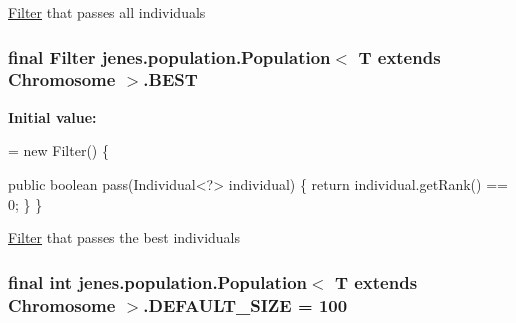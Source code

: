 \hyperlink{interfacejenes_1_1population_1_1_population_3_01_t_01extends_01_chromosome_01_4_1_1_filter}{Filter} that passes all individuals \hypertarget{classjenes_1_1population_1_1_population_3_01_t_01extends_01_chromosome_01_4_abf7824fc3827456cc071a313586adf20}{
\subsubsection[{B\-E\-S\-T}]{\setlength{\rightskip}{0pt plus 5cm}final Filter jenes.\-population.\-Population$<$ T extends Chromosome $>$.B\-E\-S\-T\hspace{0.3cm}{\ttfamily [static]}}}\label{classjenes_1_1population_1_1_population_3_01_t_01extends_01_chromosome_01_4_abf7824fc3827456cc071a313586adf20}
{\bfseries Initial value\-:}
\begin{DoxyCode}
= \textcolor{keyword}{new} Filter() \{

        \textcolor{keyword}{public} \textcolor{keywordtype}{boolean} pass(Individual<?> individual) \{
            \textcolor{keywordflow}{return} individual.getRank() == 0;
        \}
    \}
\end{DoxyCode}
\hyperlink{interfacejenes_1_1population_1_1_population_3_01_t_01extends_01_chromosome_01_4_1_1_filter}{Filter} that passes the best individuals \hypertarget{classjenes_1_1population_1_1_population_3_01_t_01extends_01_chromosome_01_4_aada0b23838115e85378efcd67c1904e3}{
\subsubsection[{D\-E\-F\-A\-U\-L\-T\-\_\-\-S\-I\-Z\-E}]{\setlength{\rightskip}{0pt plus 5cm}final int jenes.\-population.\-Population$<$ T extends Chromosome $>$.D\-E\-F\-A\-U\-L\-T\-\_\-\-S\-I\-Z\-E = 100\hspace{0.3cm}{\ttfamily [static]}}}\label{classjenes_1_1population_1_1_population_3_01_t_01extends_01_chromosome_01_4_aada0b23838115e85378efcd67c1904e3}
